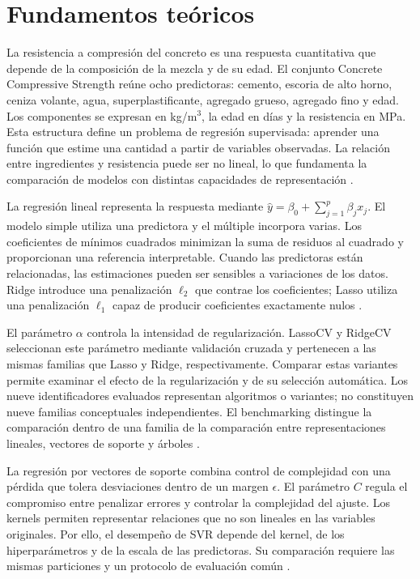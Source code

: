 \section{Fundamentos teóricos}

La resistencia a compresión del concreto es una respuesta cuantitativa que
depende de la composición de la mezcla y de su edad. El conjunto Concrete
Compressive Strength reúne ocho predictoras: cemento, escoria de alto horno,
ceniza volante, agua, superplastificante, agregado grueso, agregado fino y edad.
Los componentes se expresan en kg/m$^3$, la edad en días y la resistencia en MPa.
Esta estructura define un problema de regresión supervisada: aprender una
función que estime una cantidad a partir de variables observadas. La relación
entre ingredientes y resistencia puede ser no lineal, lo que fundamenta la
comparación de modelos con distintas capacidades de representación
\cite{uci_concrete,yeh1998}.

La regresión lineal representa la respuesta mediante
$\hat y=\beta_0+\sum_{j=1}^{p}\beta_jx_j$. El modelo simple utiliza una
predictora y el múltiple incorpora varias. Los coeficientes de mínimos
cuadrados minimizan la suma de residuos al cuadrado y proporcionan una
referencia interpretable. Cuando las predictoras están relacionadas, las
estimaciones pueden ser sensibles a variaciones de los datos. Ridge introduce
una penalización $\ell_2$ que contrae los coeficientes; Lasso utiliza una
penalización $\ell_1$ capaz de producir coeficientes exactamente nulos
\cite{sklearn_lineales,hoerl1970,tibshirani1996}.

El parámetro $\alpha$ controla la intensidad de regularización. LassoCV y
RidgeCV seleccionan este parámetro mediante validación cruzada y pertenecen a
las mismas familias que Lasso y Ridge, respectivamente. Comparar estas
variantes permite examinar el efecto de la regularización y de su selección
automática. Los nueve identificadores evaluados representan algoritmos o
variantes; no constituyen nueve familias conceptuales independientes. El
benchmarking distingue la comparación dentro de una familia de la comparación
entre representaciones lineales, vectores de soporte y árboles
\cite{sklearn_lineales,cawley2010}.

La regresión por vectores de soporte combina control de complejidad con una
pérdida que tolera desviaciones dentro de un margen $\epsilon$. El parámetro
$C$ regula el compromiso entre penalizar errores y controlar la complejidad
del ajuste. Los kernels permiten representar relaciones que no son lineales
en las variables originales. Por ello, el desempeño de SVR depende del kernel,
de los hiperparámetros y de la escala de las predictoras. Su comparación
requiere las mismas particiones y un protocolo de evaluación común
\cite{smola2004}.

